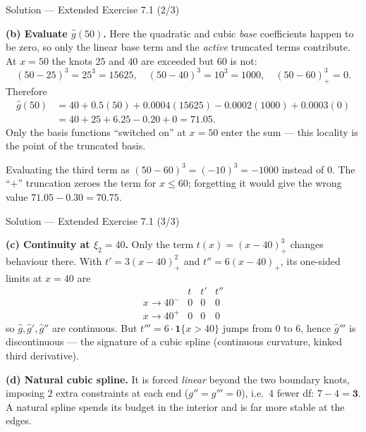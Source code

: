 \documentclass[aspectratio=169,11pt]{beamer}
\begin{document}
\begin{frame}{Solution --- Extended Exercise 7.1 (2/3)}
\begin{solutionbox}
\textbf{(b) Evaluate $\hat g(50)$.} Here the quadratic and cubic \emph{base} coefficients happen to be zero, so only the linear base term and the \emph{active} truncated terms contribute. At $x=50$ the knots $25$ and $40$ are exceeded but $60$ is not:
\[ (50-25)^3=25^3=15625,\quad (50-40)^3=10^3=1000,\quad (50-60)^3_+=0. \]
Therefore
\begin{align*}
\hat g(50)&=40+0.5(50)+0.0004(15625)-0.0002(1000)+0.0003(0)\\
&=40+25+6.25-0.20+0 = \mathbf{71.05}.
\end{align*}
Only the basis functions ``switched on'' at $x=50$ enter the sum --- this locality is the point of the truncated basis.
\end{solutionbox}
\begin{mistake}
Evaluating the third term as $(50-60)^3=(-10)^3=-1000$ instead of $0$. The ``$+$'' truncation zeroes the term for $x\le 60$; forgetting it would give the wrong value $71.05-0.30=70.75$.
\end{mistake}
\end{frame}

\begin{frame}{Solution --- Extended Exercise 7.1 (3/3)}
\begin{solutionbox}
\textbf{(c) Continuity at $\xi_2=40$.} Only the term $t(x)=(x-40)^3_+$ changes behaviour there. With $t'=3(x-40)^2_+$ and $t''=6(x-40)_+$, its one-sided limits at $x=40$ are
\[
\begin{array}{c|ccc}
 & t & t' & t'' \\\hline
x\to40^- & 0 & 0 & 0\\
x\to40^+ & 0 & 0 & 0
\end{array}
\]
so $\hat g,\hat g',\hat g''$ are continuous. But $t'''=6\cdot\mathbf{1}\{x>40\}$ jumps from $0$ to $6$, hence $\hat g'''$ is discontinuous --- the signature of a cubic spline (continuous curvature, kinked third derivative).

\medskip
\textbf{(d) Natural cubic spline.} It is forced \emph{linear} beyond the two boundary knots, imposing $2$ extra constraints at each end ($g''=g'''=0$), i.e.\ $4$ fewer df: $7-4=\mathbf{3}$. A natural spline spends its budget in the interior and is far more stable at the edges.
\end{solutionbox}
\end{frame}
\end{document}
